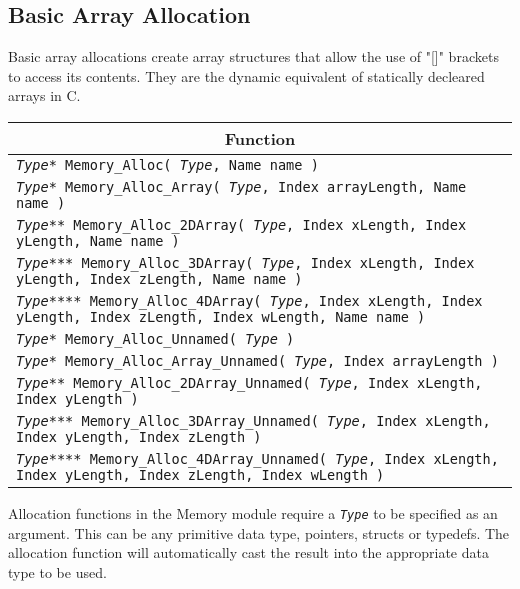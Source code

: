 \documentclass[a4paper,12pt]{article}
\begin{document}
\subsection{Basic Array Allocation}
Basic array allocations create array structures that allow the use of "[]" brackets to access its contents. They are the dynamic equivalent of statically decleared arrays in C.
\begin{table}[h]
  \begin{tabular}{|p{13.3cm}|}
    \hline \multicolumn{1}{|c|}{\textbf{Function}} \\ \hline
    \texttt{\textit{Type}* Memory\_Alloc( \textit{Type}, Name name )} \\ \hline
    \texttt{\textit{Type}* Memory\_Alloc\_Array( \textit{Type}, Index arrayLength, Name name )} \\ \hline
    \texttt{\textit{Type}** Memory\_Alloc\_2DArray( \textit{Type}, Index xLength, Index yLength, Name name )} \\ \hline
    \texttt{\textit{Type}*** Memory\_Alloc\_3DArray( \textit{Type}, Index xLength, Index yLength, Index zLength, Name name )} \\ \hline
    \texttt{\textit{Type}**** Memory\_Alloc\_4DArray( \textit{Type}, Index xLength, Index yLength, Index zLength, Index wLength, Name name )} \\ \hline
    \texttt{\textit{Type}* Memory\_Alloc\_Unnamed( \textit{Type} )} \\ \hline
    \texttt{\textit{Type}* Memory\_Alloc\_Array\_Unnamed( \textit{Type}, Index arrayLength )} \\ \hline
    \texttt{\textit{Type}** Memory\_Alloc\_2DArray\_Unnamed( \textit{Type}, Index xLength, Index yLength )} \\ \hline
    \texttt{\textit{Type}*** Memory\_Alloc\_3DArray\_Unnamed( \textit{Type}, Index xLength, Index yLength, Index zLength )} \\ \hline
    \texttt{\textit{Type}**** Memory\_Alloc\_4DArray\_Unnamed( \textit{Type}, Index xLength, Index yLength, Index zLength, Index wLength )} \\ \hline
  \end{tabular}
\end{table}

Allocation functions in the Memory module require a \texttt{\textit{Type}} to be specified as an argument. This can be any primitive data type, pointers, structs or typedefs. The allocation function will automatically cast the result into the appropriate data type to be used.
\end{document}

